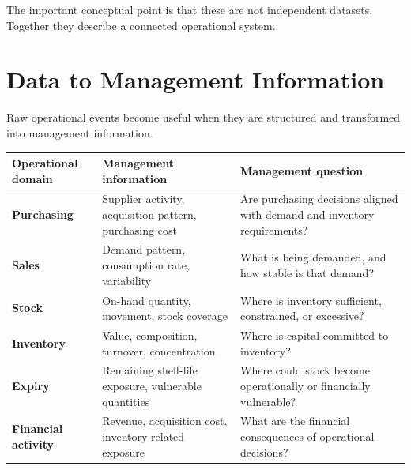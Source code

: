 \documentclass[11pt,a4paper]{article}
\begin{document}
The important conceptual point is that these are not independent datasets.
Together they describe a connected operational system.

\section{Data to Management Information}

Raw operational events become useful when they are structured and transformed
into management information.

\begin{center}
\end{center}

\begin{center}
\renewcommand{\arraystretch}{1.35}
\begin{tabularx}{\textwidth}{>{\bfseries}p{31mm} X X}
\toprule
Operational domain & Management information & Management question \\
\midrule
Purchasing & Supplier activity, acquisition pattern, purchasing cost &
Are purchasing decisions aligned with demand and inventory requirements? \\
Sales & Demand pattern, consumption rate, variability &
What is being demanded, and how stable is that demand? \\
Stock & On-hand quantity, movement, stock coverage &
Where is inventory sufficient, constrained, or excessive? \\
Inventory & Value, composition, turnover, concentration &
Where is capital committed to inventory? \\
Expiry & Remaining shelf-life exposure, vulnerable quantities &
Where could stock become operationally or financially vulnerable? \\
Financial activity & Revenue, acquisition cost, inventory-related exposure &
What are the financial consequences of operational decisions? \\
\bottomrule
\end{tabularx}
\end{center}
\end{document}
